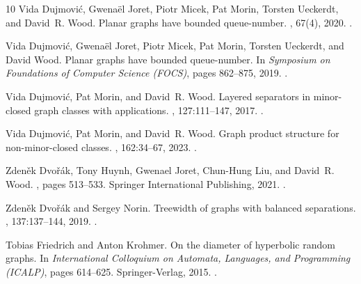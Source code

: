 \documentclass[11pt]{article}
\begin{document}
\begin{thebibliography}{10}
Vida Dujmovi\'{c}, Gwena\"{e}l Joret, Piotr Micek, Pat Morin, Torsten Ueckerdt, and David~R. Wood.
\newblock Planar graphs have bounded queue-number.
, 67(4), 2020.
\newblock \href {https://doi.org/10.1145/3385731} {}.

Vida Dujmović, Gwenaël Joret, Piotr Micek, Pat Morin, Torsten Ueckerdt, and David Wood.
\newblock Planar graphs have bounded queue-number.
\newblock In {\em Symposium on Foundations of Computer Science (FOCS)}, pages 862--875, 2019.
\newblock \href {https://doi.org/10.1109/FOCS.2019.00056} {}.

Vida Dujmović, Pat Morin, and David~R. Wood.
\newblock Layered separators in minor-closed graph classes with applications.
, 127:111--147, 2017.
\newblock \href {https://doi.org/10.1016/j.jctb.2017.05.006} {}.

Vida Dujmović, Pat Morin, and David~R. Wood.
\newblock Graph product structure for non-minor-closed classes.
, 162:34--67, 2023.
\newblock \href {https://doi.org/10.1016/j.jctb.2023.03.004} {}.

Zdeněk Dvořák, Tony Huynh, Gwenael Joret, Chun-Hung Liu, and David~R. Wood.
, pages 513--533.
\newblock Springer International Publishing, 2021.
\newblock \href {https://doi.org/10.1007/978-3-030-62497-2_32} {}.

Zdeněk Dvořák and Sergey Norin.
\newblock Treewidth of graphs with balanced separations.
, 137:137--144, 2019.
\newblock \href {https://doi.org/10.1016/j.jctb.2018.12.007} {}.

Tobias Friedrich and Anton Krohmer.
\newblock On the diameter of hyperbolic random graphs.
\newblock In {\em International Colloquium on Automata, Languages, and Programming (ICALP)}, pages 614--625. Springer-Verlag, 2015.
\newblock \href {https://doi.org/10.1007/978-3-662-47666-6_49} {}.


\end{thebibliography}
\end{document}
